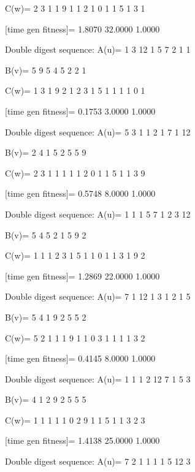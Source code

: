 C(w)=
     2     3     1     1     9     1     1     2     1     0     1     1     5     1     3     1

[time gen fitness]=
    1.8070   32.0000    1.0000

Double digest sequence:
A(u)=
     1     3    12     1     5     7     2     1     1

B(v)=
     5     9     5     4     5     2     2     1

C(w)=
     1     3     1     9     2     1     2     3     1     5     1     1     1     1     0     1

[time gen fitness]=
    0.1753    3.0000    1.0000

Double digest sequence:
A(u)=
     5     3     1     1     2     1     7     1    12

B(v)=
     2     4     1     5     2     5     5     9

C(w)=
     2     3     1     1     1     1     1     2     0     1     1     5     1     1     3     9

[time gen fitness]=
    0.5748    8.0000    1.0000

Double digest sequence:
A(u)=
     1     1     1     5     7     1     2     3    12

B(v)=
     5     4     5     2     1     5     9     2

C(w)=
     1     1     1     2     3     1     5     1     1     0     1     1     3     1     9     2

[time gen fitness]=
    1.2869   22.0000    1.0000

Double digest sequence:
A(u)=
     7     1    12     1     3     1     2     1     5

B(v)=
     5     4     1     9     2     5     5     2

C(w)=
     5     2     1     1     1     9     1     1     0     3     1     1     1     1     3     2

[time gen fitness]=
    0.4145    8.0000    1.0000

Double digest sequence:
A(u)=
     1     1     1     2    12     7     1     5     3

B(v)=
     4     1     2     9     2     5     5     5

C(w)=
     1     1     1     1     1     0     2     9     1     1     5     1     1     3     2     3

[time gen fitness]=
    1.4138   25.0000    1.0000

Double digest sequence:
A(u)=
     7     2     1     1     1     1     5    12     3

